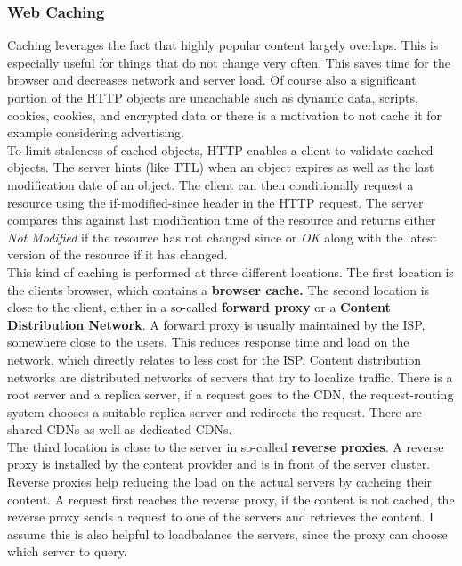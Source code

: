 \subsubsection{Web Caching}
Caching leverages the fact that highly popular content largely overlaps. This is especially useful for things that do not change very often. This saves time for the browser and decreases network and server load. Of course also a significant portion of the HTTP objects are uncachable such as dynamic data, scripts, cookies, cookies, and encrypted data or there is a motivation to not cache it for example considering advertising.\\
To limit staleness of cached objects, HTTP enables a client to validate cached objects. The server hints (like TTL) when an object expires as well as the last modification date of an object. The client can then conditionally request a resource using the if-modified-since header in the HTTP request. The server compares this against last modification time of the resource and returns either \textit{Not Modified} if the resource has not changed since or \textit{OK} along with the latest version of the resource if it has changed.\vspace{.3cm}\\
This kind of caching is performed at three different locations. The first location is the clients browser, which contains a \textbf{browser cache.} The second location is close to the client, either in a so-called \textbf{forward proxy} or a \textbf{Content Distribution Network}. A forward proxy is usually maintained by the ISP, somewhere close to the users. This reduces response time and load on the network, which directly relates to less cost for the ISP. Content distribution networks are distributed networks of servers that try to localize traffic. There is a root server and a replica server, if a request goes to the CDN, the request-routing system chooses a suitable replica server and redirects the request. There are shared CDNs as well as dedicated CDNs.\\
The third location is close to the server in so-called \textbf{reverse proxies}. A reverse proxy is installed by the content provider and is in front of the server cluster. Reverse proxies help reducing the load on the actual servers by cacheing their content. A request first reaches the reverse proxy, if the content is not cached, the reverse proxy sends a request to one of the servers and retrieves the content. I assume this is also helpful to loadbalance the servers, since the proxy can choose which server to query.



